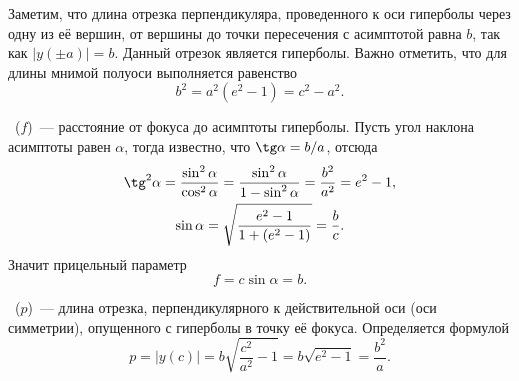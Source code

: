 Заметим, что длина отрезка перпендикуляра, проведенного к оси гиперболы через одну из её вершин, от вершины до точки пересечения с асимптотой равна $b$, так как $|y(\pm a)| = b$. Данный отрезок является  гиперболы. Важно отметить, что для длины мнимой полуоси выполняется равенство
\begin{equation*}
	b^2 = a^2 (e^2 - 1) = c^2 - a^2.
\end{equation*}

~($f$)~--- расстояние от фокуса до асимптоты гиперболы. Пусть угол наклона асимптоты равен $\alpha$, тогда известно, что $\tg \alpha = b/a$, отсюда
\begin{gather*}
	\tg^2 \alpha = \frac{\sin^2 \alpha}{\cos^2 \alpha} = \frac{\sin^2 \alpha}{1 - \sin^2 \alpha} = \frac{b^2}{a^2} = e^2 - 1,\\
	\sin \alpha =\sqrt{\frac{e^2 - 1}{1 + (e^2 - 1)}} = \frac{b}{c}.
\end{gather*}
Значит прицельный параметр
\begin{equation}
	f = c \sin \alpha = b.
\end{equation}

~($p$)~--- длина отрезка, перпендикулярного к действительной оси (оси симметрии), опущенного с гиперболы в точку её фокуса. Определяется формулой
\begin{equation}
	p= |y(c)| = b\sqrt{\frac{c^2}{a^2} - 1} = b \sqrt{e^2 - 1} = \frac{b^2}{a}.
\end{equation}

